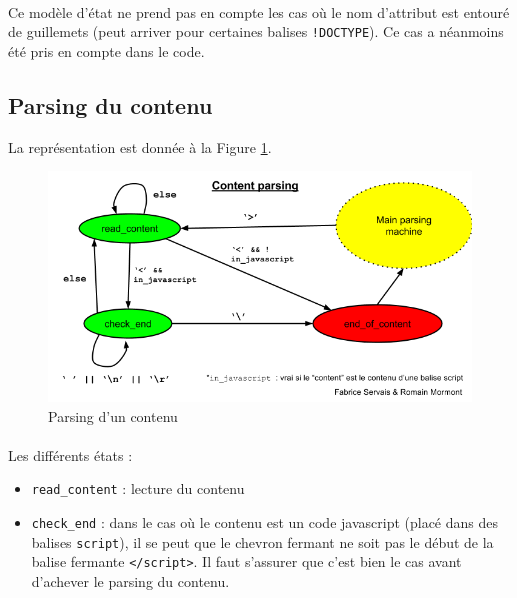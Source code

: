 \documentclass[a4paper,11pt]{article}
\begin{document}
\paragraph{}
Ce modèle d'état ne prend pas en compte les cas où le nom d'attribut est entouré de guillemets (peut arriver pour certaines balises \texttt{!DOCTYPE}). Ce cas a néanmoins été pris en compte dans le code.

\subsection{Parsing du contenu}
La représentation est donnée à la Figure \ref{fig:pars_content}.
\begin{figure}
	\center
	\includegraphics[scale=0.5]{parseContentFSM.png}
	\caption{Parsing d'un contenu}
	\label{fig:pars_content}
\end{figure}
\paragraph{}
Les différents états :
\begin{itemize}
	\item \texttt{read\_content} : lecture du contenu
	\item \texttt{check\_end} : dans le cas où le contenu est un code javascript (placé dans des balises \texttt{script}), il se peut que le chevron fermant ne soit pas le début de la balise fermante \texttt{</script>}. Il faut s'assurer que c'est bien le cas avant d'achever le parsing du contenu.
\end{itemize}
\end{document}
